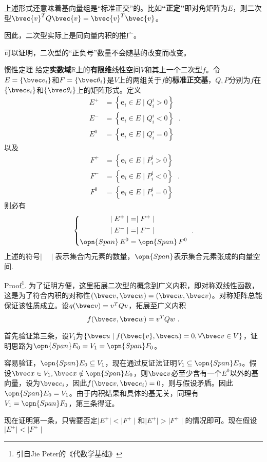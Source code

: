 上述形式还意味着基向量组是“标准正交”的。比如\textbf{“正定”}即对角矩阵为$E$，则二次型$\bvec{v}^{T}Q\bvec{v}=\bvec{v}^{T}\bvec{v}$。

因此，二次型实际上是同向量内积的推广。

可以证明，二次型的“正负号”数量不会随基的改变而改变。
\begin{theorem}{惯性定理}
给定\textbf{实数域}$\mathbb R$上的\textbf{有限维}线性空间$V$和其上一个二次型$f$。令$E=\{\bvec e_i\}$和$F=\{\bvec \theta_i\}$是$V$上的两组关于$f$的\textbf{标准正交基}，$Q,P$分别为$f$在$\{\bvec e_i\}$和$\{\bvec \theta_i\}$上的矩阵形式。定义
\begin{equation}
\begin{aligned}
E^{+} & =\left\{\mathbf{e}_i \in E \mid Q^i_i>0\right\} \\
E^{-} & =\left\{\mathbf{e}_i \in E \mid Q^i_i<0\right\} \\
E^0 & =\left\{\mathbf{e}_i \in E \mid Q^i_i=0\right\}
\end{aligned}~.
\end{equation}
以及
\begin{equation}
\begin{aligned}
F^{+} & =\left\{\mathbf{e}_i \in E \mid P^i_i>0\right\} \\
F^{-} & =\left\{\mathbf{e}_i \in E \mid P^i_i<0\right\} \\
F^0 & =\left\{\mathbf{e}_i \in E \mid P^i_i=0\right\}
\end{aligned}~.
\end{equation}
则必有
\begin{equation}
\left\{
\begin{aligned}
\mid E^{+}\mid&=\mid F^{+}\mid\\
\mid E^{-}\mid&=\mid F^{-}\mid\\
\opn{Span}\, E^{0}&=\opn{Span}\, F^{0}\\
\end{aligned}\right.~.
\end{equation}
上述的符号$\mid \quad\mid$表示集合内元素的数量，$\opn{Span}$表示集合元素张成的向量空间.
\end{theorem}
Proof\footnote{引自Jie Peter的《代数学基础》}.
为了证明方便，这里拓展二次型的概念到广义内积，即对称双线性函数，这是为了符合内积的对称性$(\bvec v,\bvec w)=(\bvec w,\bvec v)$。对称矩阵总能保证该性质成立。设$q(\bvec v)=v^T Q v$，拓展至广义内积
\begin{equation}
f(\bvec v,\bvec w)=v^T Q w~.
\end{equation}

首先验证第三条，设$V_1$为$\{\bvec u\mid f(\bvec{v},\bvec u)=0,\forall \bvec v\in V\}$，证明思路为$\opn{Span}E_0=V_1=\opn{Span}F_0$。

容易验证，$\opn{Span}E_0\subseteq V_1$，现在通过反证法证明$ V_1\subseteq \opn{Span}E_0$。假设$\bvec x\in V_1,\bvec x\notin \opn{Span}E_0$，则$\bvec v$必至少含有一个$E^0$以外的基向量，设为$\bvec e_i$，因此$f(\bvec v,\bvec e_i)=0$，则与假设矛盾。因此$\opn{Span}E_0=V_1$。由于内积结果和具体的基无关，同理有$V_1=\opn{Span}F_0$，第三条得证。

现在证明第一条，只需要否定$\mid E^{+}\mid<\mid F^{+}\mid$和$\mid E^{+}\mid>\mid F^{+}\mid$的情况即可。现在假设$\mid E^{+}\mid<\mid F^{+}\mid$

